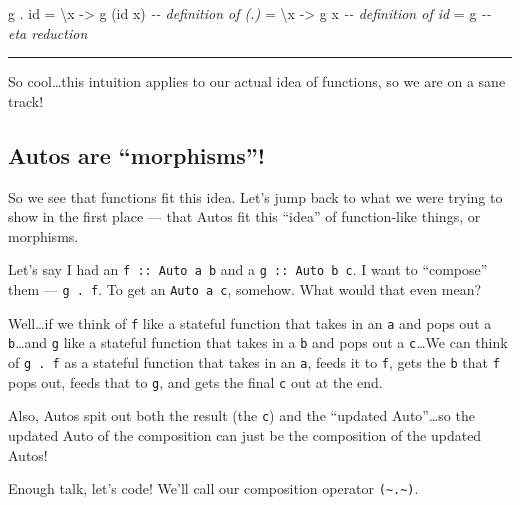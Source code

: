 \documentclass[]{article}
\newenvironment{Shaded}{}{}
\newcommand{\CommentTok}[1]{\textcolor[rgb]{0.38,0.63,0.69}{\textit{#1}}}
\newcommand{\FunctionTok}[1]{\textcolor[rgb]{0.02,0.16,0.49}{#1}}
\newcommand{\NormalTok}[1]{#1}
\newcommand{\OperatorTok}[1]{\textcolor[rgb]{0.40,0.40,0.40}{#1}}
\newcommand{\OtherTok}[1]{\textcolor[rgb]{0.00,0.44,0.13}{#1}}
\begin{document}
\begin{Shaded}
\begin{Highlighting}[]
\NormalTok{g }\OperatorTok{.} \FunctionTok{id} \OtherTok{=}\NormalTok{ \textbackslash{}x }\OtherTok{{-}\textgreater{}}\NormalTok{ g (}\FunctionTok{id}\NormalTok{ x)     }\CommentTok{{-}{-} definition of (.)}
       \OtherTok{=}\NormalTok{ \textbackslash{}x }\OtherTok{{-}\textgreater{}}\NormalTok{ g x          }\CommentTok{{-}{-} definition of id}
       \OtherTok{=}\NormalTok{ g                  }\CommentTok{{-}{-} eta reduction}
\end{Highlighting}
\end{Shaded}

\begin{center}\rule{0.5\linewidth}{0.5pt}\end{center}

So cool\ldots this intuition applies to our actual idea of functions, so we are
on a sane track!

\subsection{Autos are ``morphisms''!}\label{autos-are-morphisms}

So we see that functions fit this idea. Let's jump back to what we were trying
to show in the first place --- that Autos fit this ``idea'' of function-like
things, or morphisms.

Let's say I had an \texttt{f\ ::\ Auto\ a\ b} and a \texttt{g\ ::\ Auto\ b\ c}.
I want to ``compose'' them --- \texttt{g\ .\ f}. To get an \texttt{Auto\ a\ c},
somehow. What would that even mean?

Well\ldots if we think of \texttt{f} like a stateful function that takes in an
\texttt{a} and pops out a \texttt{b}\ldots and \texttt{g} like a stateful
function that takes in a \texttt{b} and pops out a \texttt{c}\ldots We can think
of \texttt{g\ .\ f} as a stateful function that takes in an \texttt{a}, feeds it
to \texttt{f}, gets the \texttt{b} that \texttt{f} pops out, feeds that to
\texttt{g}, and gets the final \texttt{c} out at the end.

Also, Autos spit out both the result (the \texttt{c}) and the ``updated
Auto''\ldots so the updated Auto of the composition can just be the composition
of the updated Autos!

Enough talk, let's code! We'll call our composition operator
\texttt{(\textasciitilde{}.\textasciitilde{})}.
\end{document}
